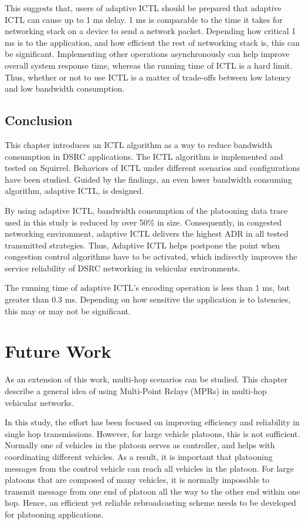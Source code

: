 \documentclass[12pt]{report}
\begin{document}
This suggests that, users of adaptive ICTL should be prepared that adaptive ICTL can cause up to 1 ms delay. 1 ms is comparable to the time it takes for networking stack on a device to send a network packet. Depending how critical 1 ms is to the application, and how efficient the rest of networking stack is, this can be significant. Implementing other operations asynchronously can help improve overall system response time, whereas the running time of ICTL is a hard limit. Thus, whether or not to use ICTL is a matter of trade-offs between low latency and low bandwidth consumption.

\section{Conclusion}

This chapter introduces an ICTL algorithm as a way to reduce bandwidth consumption in DSRC applications. The ICTL algorithm is implemented and tested on Squirrel. Behaviors of ICTL under different scenarios and configurations have been studied. Guided by the findings, an even lower bandwidth consuming algorithm, adaptive ICTL, is designed.

By using adaptive ICTL, bandwidth consumption of the platooning data trace used in this study is reduced by over 50\% in size. Consequently, in congested networking environment, adaptive ICTL delivers the highest ADR in all tested transmitted strategies. Thus, Adaptive ICTL helps postpone the point when congestion control algorithms have to be activated, which indirectly improves the service reliability of DSRC networking in vehicular environments.

The running time of adaptive ICTL's encoding operation is less than 1 ms, but greater than 0.3 ms. Depending on how sensitive the application is to latencies, this may or may not be significant.

\chapter{Future Work}

As an extension of this work, multi-hop scenarios can be studied. This chapter describe a general idea of using Multi-Point Relays (MPRs) in multi-hop vehicular networks.

In this study, the effort has been focused on improving efficiency and reliability in single hop transmissions. However, for large vehicle platoons, this is not sufficient. Normally one of vehicles in the platoon serves as controller, and helps with coordinating different vehicles. As a result, it is important that platooning messages from the control vehicle can reach all vehicles in the platoon. For large platoons that are composed of many vehicles, it is normally impossible to transmit message from one end of platoon all the way to the other end within one hop. Hence, an efficient yet reliable rebroadcasting scheme needs to be developed for platooning applications.
\end{document}
